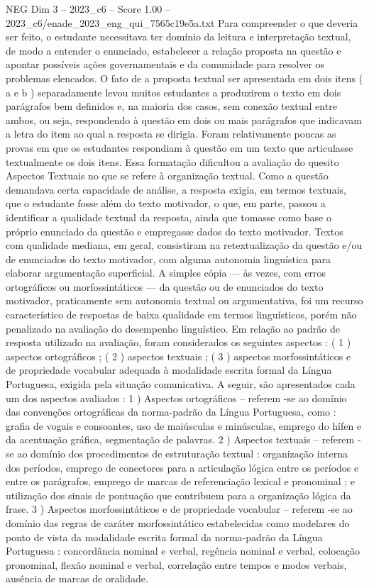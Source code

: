 \begin{textsample}{NEG Dim 3 – 2023\_c6 – Score 1.00 – 2023\_c6/enade\_2023\_eng\_qui\_7565c19e5a.txt}
Para compreender o que deveria ser feito, o estudante necessitava ter domínio da leitura e interpretação textual, de modo a entender o enunciado, estabelecer a relação proposta na questão e apontar possíveis ações governamentais e da comunidade para resolver os problemas elencados.
O fato de a proposta textual ser apresentada em dois itens ( a e b ) separadamente levou muitos estudantes a produzirem o texto em dois parágrafos bem definidos e, na maioria dos casos, sem conexão textual entre ambos, ou seja, respondendo à questão em dois ou mais parágrafos que indicavam a letra do item ao qual a resposta se dirigia.
Foram relativamente poucas as provas em que os estudantes respondiam à questão em um texto que articulasse textualmente os dois itens.
Essa formatação dificultou a avaliação do quesito Aspectos Textuais no que se refere à organização textual.
Como a questão demandava certa capacidade de análise, a resposta exigia, em termos textuais, que o estudante fosse além do texto motivador, o que, em parte, passou a identificar a qualidade textual da resposta, ainda que tomasse como base o próprio enunciado da questão e empregasse dados do texto motivador.
Textos com qualidade mediana, em geral, consistiram na retextualização da questão e/ou de enunciados do texto motivador, com alguma autonomia linguística para elaborar argumentação superficial.
A simples cópia — às vezes, com erros ortográficos ou morfossintáticos — da questão ou de enunciados do texto motivador, praticamente sem autonomia textual ou argumentativa, foi um recurso característico de respostas de baixa qualidade em termos linguísticos, porém não penalizado na avaliação do desempenho linguístico.
Em relação ao padrão de resposta utilizado na avaliação, foram considerados os seguintes aspectos : ( 1 ) aspectos ortográficos ; ( 2 ) aspectos textuais ; ( 3 ) aspectos morfossintáticos e de propriedade vocabular adequada à modalidade escrita formal da Língua Portuguesa, exigida pela situação comunicativa.
A seguir, são apresentados cada um dos aspectos avaliados : 1 ) Aspectos ortográficos – referem -se ao domínio das convenções ortográficas da norma-padrão da Língua Portuguesa, como : grafia de vogais e consoantes, uso de maiúsculas e minúsculas, emprego do hífen e da acentuação gráfica, segmentação de palavras. 2 ) Aspectos textuais – referem -se ao domínio dos procedimentos de estruturação textual : organização interna dos períodos, emprego de conectores para a articulação lógica entre os períodos e entre os parágrafos, emprego de marcas de referenciação lexical e pronominal ; e utilização dos sinais de pontuação que contribuem para a organização lógica da frase. 3 ) Aspectos morfossintáticos e de propriedade vocabular – referem -se ao domínio das regras de caráter morfossintático estabelecidas como modelares do ponto de vista da modalidade escrita formal da norma-padrão da Língua Portuguesa : concordância nominal e verbal, regência nominal e verbal, colocação pronominal, flexão nominal e verbal, correlação entre tempos e modos verbais, ausência de marcas de oralidade.

\end{textsample}

